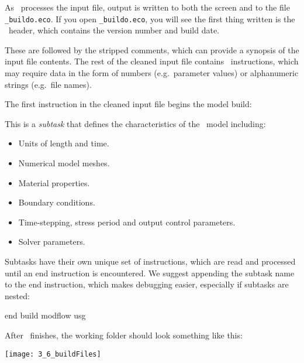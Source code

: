  As \mut\ processes the input file, output is written to both the screen and to the file \texttt{\_buildo.eco}.  If you open \texttt{\_buildo.eco}, you will see the first thing written is the \mut\ header, which contains the version number and build date.

 These are followed by the stripped comments, which  can provide a synopsis of the input file contents. The rest of the cleaned input file contains \mut\ instructions, which may require data in the form of numbers (e.g.\ parameter values) or alphanumeric strings (e.g.\ file names).


The first instruction in the cleaned input file begins the model build:

    {This  is a {\em subtask} that defines the characteristics of the \mfus\ model including:
     \begin{itemize}
        \item Units of length and time.
        \item Numerical model meshes.
        \item Material properties.
        \item Boundary conditions.
        \item Time-stepping, stress period and output control parameters.
        \item Solver parameters.
    \end{itemize}
    Subtasks have their own unique set of instructions, which are read and processed until an \textsf{end} instruction is encountered.  We suggest appending the subtask name to the \textsf{end} instruction, which makes debugging easier, especially if subtasks are nested:

    {\Large \sf end build modflow usg}
    }

After \mut\ finishes, the working folder should look something like this:

        \texttt{[image: 3\_6\_buildFiles]}


